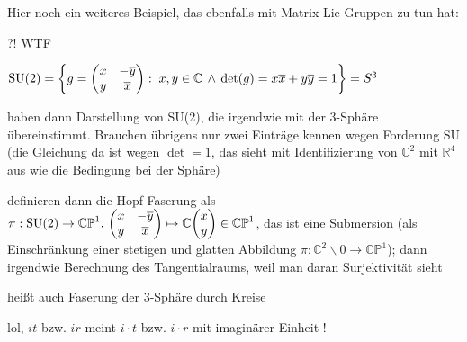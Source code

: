 \documentclass[../H_Analysis_main.tex]{subfiles}
\begin{document}
Hier noch ein weiteres Beispiel, das ebenfalls mit Matrix-Lie-Gruppen zu tun hat:
\begin{bsp}
?! WTF

$\text{SU}(2) = \qty{g = \mqty(x & -\overline{y} \\ y & \overline{x}): \; x, y \in \mathbb{C} \, \wedge \, \det(g) = x \overline{x} + y \overline{y} = 1} = S^3$

haben dann Darstellung von SU(2), die irgendwie mit der 3-Sphäre übereinstimmt. Brauchen übrigens nur zwei Einträge kennen wegen Forderung SU (die Gleichung da ist wegen $\det = 1$, das sieht mit Identifizierung von $\mathbb{C}^2$ mit $\mathbb{R}^4$ aus wie die Bedingung bei der Sphäre)

definieren dann die Hopf-Faserung als $\pi: \text{SU}(2) \rightarrow \mathbb{CP}^1, \, \mqty(x & -\overline{y} \\ y & \overline{x}) \mapsto \mathbb{C} \mqty(x \\ y) \in \mathbb{CP}^1$, das ist eine Submersion (als Einschränkung einer stetigen und glatten Abbildung $\pi: \mathbb{C}^2 \backslash \qty{0} \rightarrow \mathbb{CP}^1$); dann irgendwie Berechnung des Tangentialraums, weil man daran Surjektivität sieht

heißt auch Faserung der 3-Sphäre durch Kreise

lol, $it$ bzw. $ir$ meint $i \cdot t$ bzw. $i \cdot r$ mit imaginärer Einheit !
\end{bsp}



\newpage
\end{document}
